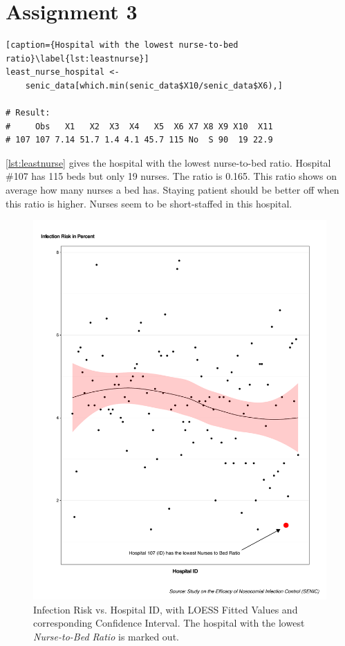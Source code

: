\documentclass[11pt]{article}
\begin{document}
\section*{Assignment 3}

\label{subsec:nurse2bed}

\begin{lstlisting}[caption={Hospital with the lowest nurse-to-bed ratio}\label{lst:leastnurse}]
least_nurse_hospital <-
    senic_data[which.min(senic_data$X10/senic_data$X6),]

# Result:
#     Obs   X1   X2  X3  X4   X5  X6 X7 X8 X9 X10  X11
# 107 107 7.14 51.7 1.4 4.1 45.7 115 No  S 90  19 22.9
\end{lstlisting}


\autoref{lst:leastnurse} gives the hospital with the lowest nurse-to-bed ratio.
Hospital \#107 has 115 beds but only 19 nurses. The ratio is 0.165. This ratio
shows on average how many nurses a bed has. Staying patient should be better off
when this ratio is higher. Nurses seem to be short-staffed in this hospital.


\begin{figure}[H]
  \centering
   \includegraphics[scale=0.5]{Assignment_3.pdf}
   \caption{Infection Risk vs. Hospital ID, with LOESS Fitted Values and corresponding Confidence Interval. The hospital with the lowest \textit{Nurse-to-Bed Ratio} is marked out.}
   \label{fig:assignment3}
\end{figure}
\end{document}

